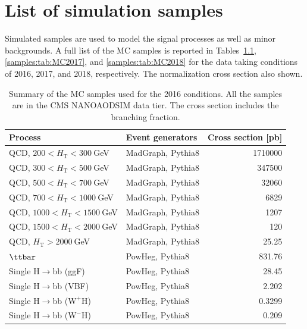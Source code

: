 \chapter{List of simulation samples} \label{appendix:samples}

Simulated samples are used to model the signal processes as well as minor backgrounds.
A full list of the MC samples is reported in Tables~\ref{samples:tab:MC2016}, \ref{samples:tab:MC2017}, and \ref{samples:tab:MC2018} for the data taking conditions of 2016, 2017, and 2018, respectively. The normalization cross section also shown.%

\begin{table}[htb]
\centering
\caption[Summary of the MC samples used for the 2016 conditions]{\label{samples:tab:MC2016}Summary of the MC samples used for the 2016 conditions. All the samples are in the CMS NANOAODSIM data tier. The cross section includes the branching fraction.}
\begin{tabularx}{\textwidth}{lXr}
\hline
Process & Event generators & Cross section [pb]\\
\hline
QCD, $200  < H_\text{T} < 300~$GeV          & MadGraph, Pythia8  & 1710000 \\
QCD, $300  < H_\text{T} < 500~$GeV          & MadGraph, Pythia8  & 347500  \\
QCD, $500  < H_\text{T} < 700~$GeV          & MadGraph, Pythia8  & 32060   \\
QCD, $700  < H_\text{T} < 1000~$GeV         & MadGraph, Pythia8  & 6829    \\
QCD, $1000 < H_\text{T} < 1500~$GeV         & MadGraph, Pythia8  & 1207    \\
QCD, $1500 < H_\text{T} < 2000~$GeV         & MadGraph, Pythia8  & 120     \\
QCD, $H_\text{T} > 2000~$GeV                & MadGraph, Pythia8  & 25.25   \\
$\ttbar$                                    & PowHeg, Pythia8    & 831.76  \\
Single H$\to$bb  (ggF)                      & PowHeg, Pythia8    & 28.45   \\ 
Single H$\to$bb  (VBF)                      & PowHeg, Pythia8    & 2.202   \\ 
Single H$\to$bb  ($\mathrm{W^{+}H}$)        & PowHeg, Pythia8    & 0.3299  \\ 
Single H$\to$bb  ($\mathrm{W^{-}H}$)        & PowHeg, Pythia8    & 0.209   \\ 

\end{tabularx}
\end{table}
